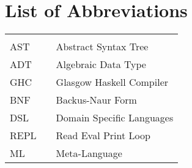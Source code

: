 
\tableofcontents
\cleardoublepage



\chapter*{List of Abbreviations}

\begin{center}
  \begin{tabular}{lll}
    \hspace*{2em} & \hspace*{1in} & \hspace*{4.5in} \\
    AST  & \dotfill & Abstract Syntax Tree \\
    ADT   & \dotfill & Algebraic Data Type \\
    GHC  & \dotfill & Glasgow Haskell Compiler \\
    BNF & \dotfill & Backus-Naur Form \\
    DSL  & \dotfill & Domain Specific Languages \\
    REPL  & \dotfill & Read Eval Print Loop \\
    ML  & \dotfill & Meta-Language \\
  \end{tabular}
\end{center}
\cleardoublepage


\newpage
\endofprelim
